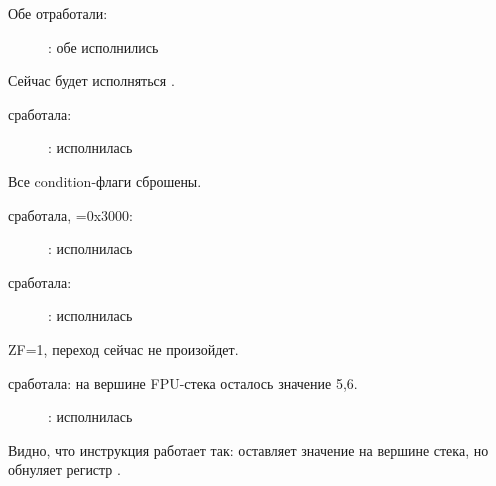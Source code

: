 Обе \FLD отработали:

\begin{figure}[H]
\centering
{}
\caption{\olly: обе \FLD исполнились}
\label{fig:FPU_comparison_Ox_case2_olly1}
\end{figure}

Сейчас будет исполняться \FCOM.

\clearpage
\FCOM сработала:

\begin{figure}[H]
\centering
{}
\caption{\olly: \FCOM исполнилась}
\label{fig:FPU_comparison_Ox_case2_olly2}
\end{figure}

Все condition-флаги сброшены.

\clearpage
\FNSTSW сработала, =0x3000:

\begin{figure}[H]
\centering
{}
\caption{\olly: \FNSTSW исполнилась}
\label{fig:FPU_comparison_Ox_case2_olly3}
\end{figure}

\clearpage
\TEST сработала:

\begin{figure}[H]
\centering
{}
\caption{\olly: \TEST исполнилась}
\label{fig:FPU_comparison_Ox_case2_olly4}
\end{figure}

ZF=1, переход сейчас не произойдет.

\clearpage
\FSTP {} сработала: на вершине FPU-стека осталось значение 5,6.

\begin{figure}[H]
\centering
{}
\caption{\olly: \FSTP исполнилась}
\label{fig:FPU_comparison_Ox_case2_olly5}
\end{figure}

Видно, что инструкция \FSTP {} работает так: оставляет значение на вершине стека, но обнуляет регистр .
